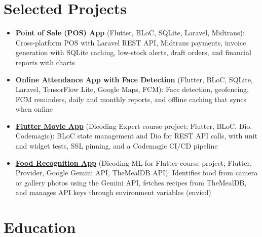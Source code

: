 \documentclass{resume}
\begin{document}


\section{Selected Projects}
\begin{itemize}
\item \textbf{Point of Sale (POS) App} (Flutter, BLoC, SQLite, Laravel, Midtrans): Cross-platform POS with Laravel REST API, Midtrans payments, invoice generation with SQLite caching, low-stock alerts, draft orders, and financial reports with charts
\item \textbf{Online Attendance App with Face Detection} (Flutter, BLoC, SQLite, Laravel, TensorFlow Lite, Google Maps, FCM): Face detection, geofencing, FCM reminders, daily and monthly reports, and offline caching that syncs when online
\item \textbf{\href{https://github.com/IlhamGhaza/flutter_movie}{Flutter Movie App}} (Dicoding Expert course project; Flutter, BLoC, Dio, Codemagic): BLoC state management and Dio for REST API calls, with unit and widget tests, SSL pinning, and a Codemagic CI/CD pipeline
\item \textbf{\href{https://github.com/IlhamGhaza/flutter_food_recog}{Food Recognition App}} (Dicoding ML for Flutter course project; Flutter, Provider, Google Gemini API, TheMealDB API): Identifies food from camera or gallery photos using the Gemini API, fetches recipes from TheMealDB, and manages API keys through environment variables (envied)
\end{itemize}


\section{Education}
\end{document}
